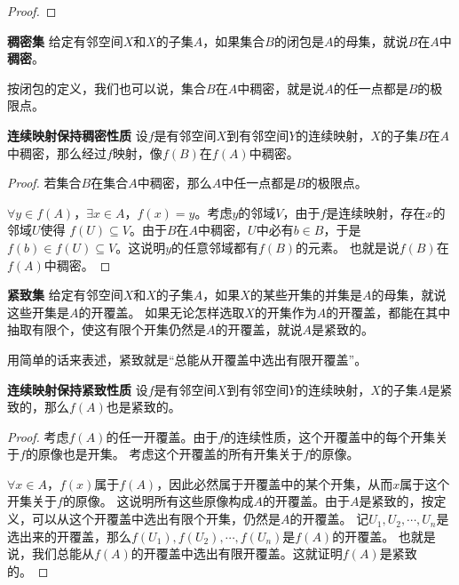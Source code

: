 \documentclass[12pt,UTF8,fontset=none]{ctexbook}
\begin{document}
\begin{appendix}
\begin{proof}
\end{proof}

\begin{df}{\textbf{稠密集}}
    给定有邻空间$X$和$X$的子集$A$，如果集合$B$的闭包是$A$的母集，就说$B$在$A$中\textbf{稠密}。
\end{df}

按闭包的定义，我们也可以说，集合$B$在$A$中稠密，就是说$A$的任一点都是$B$的极限点。

\begin{tm}{\textbf{连续映射保持稠密性质}}
    设$f$是有邻空间$X$到有邻空间$Y$的连续映射，$X$的子集$B$在$A$中稠密，那么经过$f$映射，像$f(B)$在$f(A)$中稠密。
\end{tm}

\begin{proof}
    若集合$B$在集合$A$中稠密，那么$A$中任一点都是$B$的极限点。

    $\forall y\in f(A)$，$\exists x\in A$，$f(x) = y$。考虑$y$的邻域$V$，由于$f$是连续映射，存在$x$的邻域$U$使得
    $f(U)\subseteq V$。由于$B$在$A$中稠密，$U$中必有$b\in B$，于是$f(b)\in f(U) \subseteq V$。这说明$y$的任意邻域都有$f(B)$的元素。
    也就是说$f(B)$在$f(A)$中稠密。
\end{proof}

\begin{df}{\textbf{紧致集}}
    给定有邻空间$X$和$X$的子集$A$，如果$X$的某些开集的并集是$A$的母集，就说这些开集是$A$的开覆盖。
    如果无论怎样选取$X$的开集作为$A$的开覆盖，都能在其中抽取有限个，使这有限个开集仍然是$A$的开覆盖，就说$A$是紧致的。
\end{df}

用简单的话来表述，紧致就是“总能从开覆盖中选出有限开覆盖”。

\begin{tm}{\textbf{连续映射保持紧致性质}}
    设$f$是有邻空间$X$到有邻空间$Y$的连续映射，$X$的子集$A$是紧致的，那么$f(A)$也是紧致的。
\end{tm}

\begin{proof}
    考虑$f(A)$的任一开覆盖。由于$f$的连续性质，这个开覆盖中的每个开集关于$f$的原像也是开集。
    考虑这个开覆盖的所有开集关于$f$的原像。

    $\forall x\in A$，$f(x)$属于$f(A)$，因此必然属于开覆盖中的某个开集，从而$x$属于这个开集关于$f$的原像。
    这说明所有这些原像构成$A$的开覆盖。由于$A$是紧致的，按定义，可以从这个开覆盖中选出有限个开集，仍然是$A$的开覆盖。
    记$U_1, U_2, \cdots, U_n$是选出来的开覆盖，那么$f(U_1), f(U_2), \cdots , f(U_n)$是$f(A)$的开覆盖。
    也就是说，我们总能从$f(A)$的开覆盖中选出有限开覆盖。这就证明$f(A)$是紧致的。


\end{proof}
\end{appendix}
\end{document}
